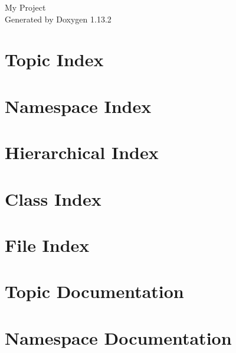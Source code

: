 \documentclass[twoside]{book}
\newcommand{\+}{\discretionary{\mbox{\scriptsize$\hookleftarrow$}}{}{}}
\newcommand{\clearemptydoublepage}{%
    \newpage{\pagestyle{empty}\cleardoublepage}%
  }
\begin{document}
  \raggedbottom
    \hypersetup{pageanchor=false,
                bookmarksnumbered=true,
                pdfencoding=unicode
               }
  \begin{titlepage}
  \vspace*{7cm}
  \begin{center}%
  {\Large My Project}\\
  \vspace*{1cm}
  {\large Generated by Doxygen 1.13.2}\\
  \end{center}
  \end{titlepage}
  \clearemptydoublepage
  \tableofcontents
  \clearemptydoublepage
  \hypersetup{pageanchor=true}
\chapter{Topic Index}

\chapter{Namespace Index}

\chapter{Hierarchical Index}

\chapter{Class Index}

\chapter{File Index}

\chapter{Topic Documentation}

\chapter{Namespace Documentation}




\end{document}
